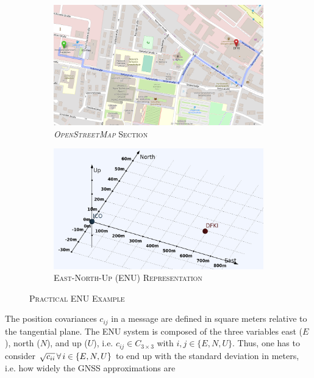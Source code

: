 \documentclass[english, master, utf8]{base/thesis_KBS}
\newcommand{\code}{\collectverb{\codebox}}
\begin{document}
\begin{figure}[H]
    \centering
    \begin{subfigure}[b]{0.49\textwidth}
        \centering
        \includegraphics[width=\textwidth]{pics/ICO_DFKI_map.png}
        \caption{\textsc{\textit{OpenStreetMap} Section}}
        \label{fig:ICO_DFKI_map}
    \end{subfigure}
    \hfill
    \begin{subfigure}[b]{0.49\textwidth}
        \centering
        \includegraphics[width=\textwidth]{pics/ICO_DFKI_ENU.png}
        \caption{\textsc{East-North-Up (ENU) Representation}}
        \label{fig:ICO_DFKI_ENU}
    \end{subfigure}
\caption{\textsc{Practical ENU Example}}
\label{fig:ENU_example}
\end{figure}
\noindent
The position covariances $c_{ij}$ in a \code{NavSatFix} message are defined in square meters relative to the tangential plane.
The ENU system is composed of the three variables east ($E$), north ($N$), and up ($U$), i.e. $c_{ij} \in C_{3 \times 3}$ with $i, j \in \{E, N, U\}$.
Thus, one has to consider $\sqrt{c_{ii}} \thinspace \forall \thinspace i \in \{E, N, U\}$ to end up with the standard deviation in meters, i.e. how widely the GNSS approximations are
\end{document}
